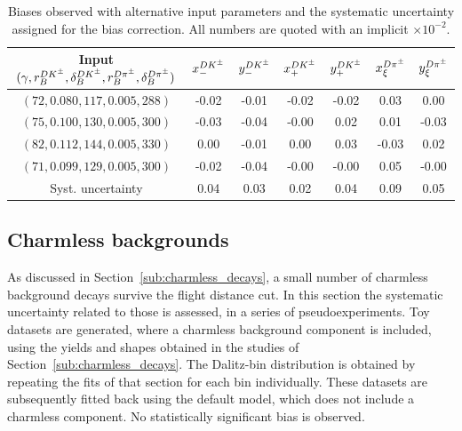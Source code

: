
\begin{table}
  \centering
  \caption{Biases observed with alternative input parameters and the systematic uncertainty assigned for the bias correction.
  All numbers are quoted with an implicit $\times 10^{-2}$.
  \label{tab:bias_syst}
  }  



\begin{tabular}{c|cccccc}
\toprule
Input $(\gamma, r_B^{{{D}{{K}^\pm}}}, \delta_B^{{{D}{{K}^\pm}}}, r_B^{D\pi^\pm}, \delta_B^{D\pi^\pm})$ 
& $x_-^{{{D}{{K}^\pm}}} $& $y_-^{{{D}{{K}^\pm}}} $& $x_+^{{{D}{{K}^\pm}}} $& $y_+^{{{D}{{K}^\pm}}} $& $x_\xi^{D\pi^\pm} $& $y_\xi^{D\pi^\pm}$ \\
\midrule
$(72, 0.080, 117, 0.005, 288)$ & -0.02& -0.01& -0.02& -0.02& 0.03& 0.00 \\
$(75, 0.100, 130, 0.005, 300)$ & -0.03& -0.04& -0.00& 0.02& 0.01& -0.03 \\
$(82, 0.112, 144, 0.005, 330)$ & 0.00& -0.01& 0.00& 0.03& -0.03& 0.02 \\
$(71, 0.099, 129, 0.005, 300)$ & -0.02& -0.04& -0.00& -0.00& 0.05& -0.00 \\
\midrule
Syst. uncertainty & 0.04& 0.03& 0.02& 0.04& 0.09& 0.05 \\
\bottomrule
\end{tabular}

\end{table}




\subsection{Charmless backgrounds} %
\label{sub:systematics_from_charmless_backgrounds}

As discussed in Section~\ref{sub:charmless_decays}, a small number of charmless background decays survive the \D flight distance cut. In this section the systematic uncertainty related to those is assessed, in a series of pseudoexperiments. Toy datasets are generated, where a charmless background component is included, using the yields and shapes obtained in the studies of Section~\ref{sub:charmless_decays}. The Dalitz-bin distribution is obtained by repeating the fits of that section for each bin individually. These datasets are subsequently fitted back using the default model, which does not include a charmless component. No statistically significant bias is observed.

